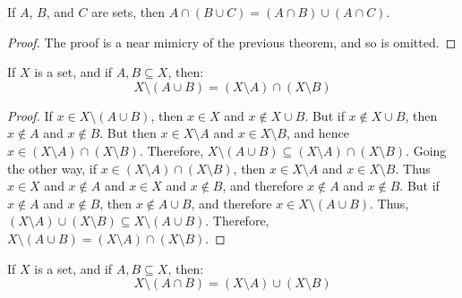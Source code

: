             \begin{theorem}
                If $A$, $B$, and $C$ are sets, then
                $A\cap(B\cup{C})=(A\cap{B})\cup(A\cap{C})$.
            \end{theorem}
            \begin{proof}
                The proof is a near mimicry of the previous theorem, and so is
                omitted.
            \end{proof}
            \begin{theorem}
                If $X$ is a set, and if $A,B\subseteq{X}$, then:
                \begin{equation}
                    X\setminus(A\cup{B})=
                    (X\setminus{A})\cap(X\setminus{B})
                \end{equation}
            \end{theorem}
            \begin{proof}
                If $x\in{X}\setminus(A\cup{B})$, then
                $x\in{X}$ and $x\notin{X}\cup{B}$. But if
                $x\notin{X}\cup{B}$, then $x\notin{A}$ and
                $x\notin{B}$. But then
                $x\in{X}\setminus{A}$ and $x\in{X}\setminus{B}$, and
                hence $x\in(X\setminus{A})\cap(X\setminus{B})$. Therefore,
                $X\setminus(A\cup{B})\subseteq(X\setminus{A})\cap(X\setminus{B})$.
                Going the other way, if
                $x\in(X\setminus{A})\cap(X\setminus{B})$, then
                $x\in{X}\setminus{A}$ and $x\in{X}\setminus{B}$. Thus
                $x\in{X}$ and $x\notin{A}$ and $x\in{X}$ and $x\notin{B}$, and
                therefore $x\notin{A}$ and $x\notin{B}$. But if $x\notin{A}$
                and $x\notin{B}$, then $x\notin{A}\cup{B}$, and therefore
                $x\in{X}\setminus(A\cup{B})$. Thus,
                $(X\setminus{A})\cup(X\setminus{B})\subseteq{X}\setminus(A\cup{B})$.
                Therefore,
                $X\setminus(A\cup{B})=(X\setminus{A})\cap(X\setminus{B})$.
            \end{proof}
            \begin{theorem}
                If $X$ is a set, and if $A,B\subseteq{X}$, then:
                \begin{equation}
                    X\setminus(A\cap{B})=
                    (X\setminus{A})\cup(X\setminus{B})
                \end{equation}
            \end{theorem}
